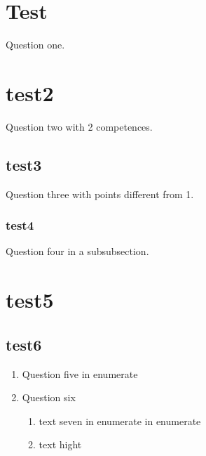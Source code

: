 \documentclass{article}
\begin{document}




\section{Test}
Question one.

\section{test2}
Question two with 2 competences.

\subsection{test3}
Question three with points different from 1.

\subsubsection{test4}
Question four in a subsubsection.


\section{test5}
\subsection{test6}
\begin{enumerate}
 \item Question five in enumerate 
 \item Question six 
  \begin{enumerate}
    \item text seven in enumerate in enumerate
    \item text hight 
  \end{enumerate}
\end{enumerate}
\end{document}
